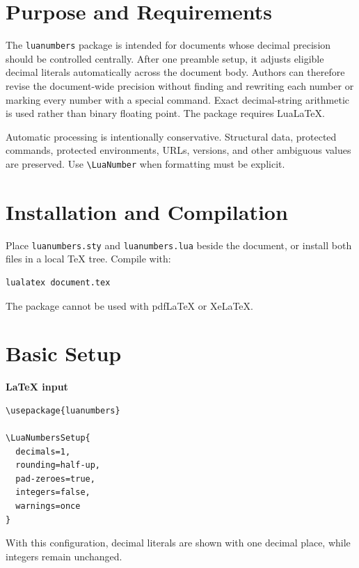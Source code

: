 \documentclass[11pt]{article}
\newcommand\InputHeading{\par\smallskip\noindent\textbf{LaTeX input}\par\smallskip}
\begin{document}
\clearpage
\tableofcontents

\section{Purpose and Requirements}

The \texttt{luanumbers} package is intended for documents whose decimal
precision should be controlled centrally. After one preamble setup, it adjusts
eligible decimal literals automatically across the document body. Authors can
therefore revise the document-wide precision without finding and rewriting
each number or marking every number with a special command. Exact
decimal-string arithmetic is used rather than binary floating point. The
package requires LuaLaTeX.

\begin{importantnote}
Automatic processing is intentionally conservative. Structural data, protected
commands, protected environments, URLs, versions, and other ambiguous values
are preserved. Use \verb|\LuaNumber| when formatting must be explicit.
\end{importantnote}

\section{Installation and Compilation}

Place \texttt{luanumbers.sty} and \texttt{luanumbers.lua} beside the document,
or install both files in a local TeX tree. Compile with:

\begin{lstlisting}[style=latexinput,language=bash,numbers=none]
lualatex document.tex
\end{lstlisting}

The package cannot be used with pdfLaTeX or XeLaTeX.

\section{Basic Setup}

\InputHeading
\LuaNumbersOff
\begin{lstlisting}[style=latexinput]
\usepackage{luanumbers}

\LuaNumbersSetup{
  decimals=1,
  rounding=half-up,
  pad-zeroes=true,
  integers=false,
  warnings=once
}
\end{lstlisting}
\LuaNumbersOn

With this configuration, decimal literals are shown with one decimal place,
while integers remain unchanged.
\end{document}
